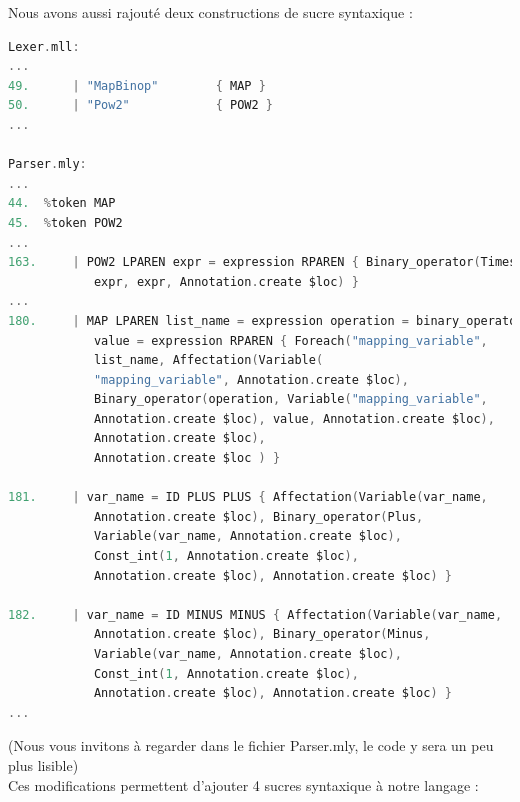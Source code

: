 \documentclass{report}
\begin{document}
    Nous avons aussi rajouté deux constructions de sucre syntaxique :\\

    \begin{lstlisting}[language=C, basicstyle=\ttfamily]
Lexer.mll:
...
49.      | "MapBinop"        { MAP } 
50.      | "Pow2"            { POW2 }
...

Parser.mly:
...
44.  %token MAP
45.  %token POW2
...
163.     | POW2 LPAREN expr = expression RPAREN { Binary_operator(Times, 
            expr, expr, Annotation.create $loc) }
...
180.     | MAP LPAREN list_name = expression operation = binary_operator 
            value = expression RPAREN { Foreach("mapping_variable", 
            list_name, Affectation(Variable(
            "mapping_variable", Annotation.create $loc), 
            Binary_operator(operation, Variable("mapping_variable", 
            Annotation.create $loc), value, Annotation.create $loc),
            Annotation.create $loc), 
            Annotation.create $loc ) }

181.     | var_name = ID PLUS PLUS { Affectation(Variable(var_name,
            Annotation.create $loc), Binary_operator(Plus,
            Variable(var_name, Annotation.create $loc),
            Const_int(1, Annotation.create $loc),
            Annotation.create $loc), Annotation.create $loc) }

182.     | var_name = ID MINUS MINUS { Affectation(Variable(var_name,
            Annotation.create $loc), Binary_operator(Minus, 
            Variable(var_name, Annotation.create $loc), 
            Const_int(1, Annotation.create $loc), 
            Annotation.create $loc), Annotation.create $loc) }
...
    \end{lstlisting}

    (Nous vous invitons à regarder dans le fichier Parser.mly, le code y sera un peu plus lisible)\\
    Ces modifications permettent d'ajouter 4 sucres syntaxique à notre langage :\\
\end{document}
